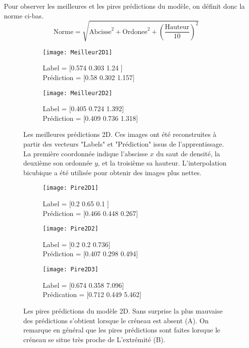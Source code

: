     Pour observer les meilleures et les pires prédictions du modèle, on définit donc la norme ci-bas. $$ \text{Norme} = \sqrt{\text{Abcisse}^2 + \text{Ordonee}^2 + \left( \frac{\text{Hauteur}}{10} \right)^2}$$
    
    \begin{figure}[!h]
    \begin{subfigure}{.5\textwidth}
    \centering
    \texttt{[image: Meilleur2D1]}  
    \caption[Meilleur2D1]{Label = [0.574 0.303 1.24 ] \\ Prédiction = [0.58  0.302 1.157]}
    \end{subfigure}
    \begin{subfigure}{.5\textwidth}
    \centering
    \texttt{[image: Meilleur2D2]}  
    \caption[Meilleur2D2]{Label = [0.405 0.724 1.392]  \\  Prédiction = [0.409 0.736 1.318]}
    \end{subfigure}
    
     \centering
    \decoRule
    \caption[Meilleur 2D]{Les meilleures prédictions 2D. Ces images ont été reconstruites à partir des vecteurs "Labels" et "Prédiction" issus de l'apprentissage. La première coordonnée indique l'abscisse $x$ du saut de densité, la deuxième son ordonnée $y$, et la troisième sa hauteur. L'interpolation bicubique a été utilisée pour obtenir des images plus nettes.}
    \label{fig:Meilleur2D}
    \end{figure}

    \begin{figure}[H]
    \begin{subfigure}{.33\textwidth}
    \centering
    \texttt{[image: Pire2D1]}  
    \caption[Pire2D1]{Label = [0.2  0.65 0.1 ] \\ Prédiction = [0.466 0.448 0.267]}
    \end{subfigure}
    \begin{subfigure}{.33\textwidth}
    \centering
    \texttt{[image: Pire2D2]}  
    \caption[Pire2D2]{Label = [0.2   0.2   0.736]  \\ Prédiction = [0.407 0.298 0.494]}
    \end{subfigure}
    \begin{subfigure}{.33\textwidth}
    \centering
    \texttt{[image: Pire2D3]}  
    \caption[Pire2D3]{Label = [0.674 0.358 7.096]  \\ Prédication = [0.712 0.449 5.462]}
    \end{subfigure}

     \centering
    \decoRule
    \caption[Pire2D]{Les pires prédictions du modèle 2D. Sans surprise la plus mauvaise des prédictions s'obtient lorsque le créneau est absent (A). On remarque en général que les pires prédictions sont faites lorsque le créneau se situe très proche de L'extrémité (B).}
    \label{fig:Pire2D}
    \end{figure}
    
